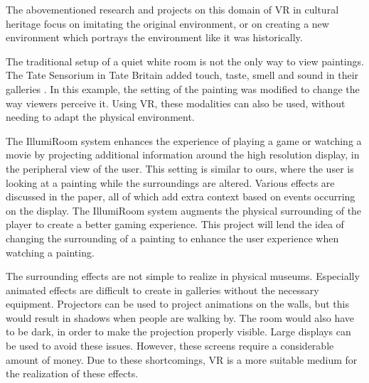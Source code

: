 \documentclass[a4paper]{article}
\begin{document}

The abovementioned research and projects on this domain of VR in cultural heritage focus on imitating the original environment, or on creating a new environment which portrays the environment like it was historically. 

The traditional setup of a quiet white room is not the only way to view paintings. The Tate Sensorium\cite{tate1} in Tate Britain added touch, taste, smell and sound in their galleries \cite{tate2}. In this example, the setting of the painting was modified to change the way viewers perceive it. Using VR, these modalities can also be used, without needing to adapt the physical environment.

The IllumiRoom system \cite{illumiroom} enhances the experience of playing a game or watching a movie by projecting additional information around the high resolution display, in the peripheral view of the user. This setting is similar to ours, where the user is looking at a painting while the surroundings are altered. Various effects are discussed in the paper, all of which add extra context based on events occurring on the display. The IllumiRoom system augments the physical surrounding of the player to create a better gaming experience. This project will lend the idea of changing the surrounding of a painting to enhance the user experience  when watching a painting.

The surrounding effects are not simple to realize in physical museums. Especially animated effects are difficult to create in galleries without the necessary equipment. Projectors can be used to project animations on the walls, but this would result in shadows when people are walking by. The room would also have to be dark, in order to make the projection properly visible. Large displays can be used to avoid these issues. However, these screens require a considerable amount of money. Due to these shortcomings, VR is a more suitable medium for the realization of these effects. 
\end{document}
